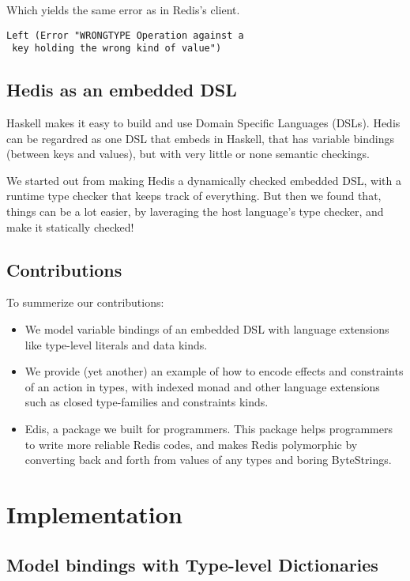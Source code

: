 \documentclass[pldi]{sigplanconf-pldi16}
\begin{document}
Which yields the same error as in Redis's client.

\begin{verbatim}
Left (Error "WRONGTYPE Operation against a
 key holding the wrong kind of value")
\end{verbatim}

\subsection{Hedis as an embedded DSL}

Haskell makes it easy to build and use Domain Specific Languages (DSLs).
Hedis can be regardred as one DSL that embeds in Haskell, that has variable
bindings (between keys and values), but with very little or none semantic
checkings.

We started out from making Hedis a dynamically checked embedded DSL, with a
runtime type checker that keeps track of everything. But then we found that,
things can be a lot easier, by laveraging the host language's type checker,
and make it statically checked!

\subsection{Contributions}

To summerize our contributions:

\begin{itemize}[noitemsep]
\item We model variable bindings of an embedded DSL with language extensions
like type-level literals and data kinds.
\item We provide (yet another) an example of how to encode effects and
constraints of an action in types, with indexed monad and other language
 extensions such as closed type-families and constraints kinds.
\item Edis, a package we built for programmers. This package helps programmers
to write more reliable Redis codes, and makes Redis polymorphic by converting
back and forth from values of any types and boring ByteStrings.
\end{itemize}

\section{Implementation}
\subsection{Model bindings with Type-level Dictionaries}
\end{document}

